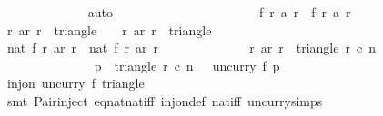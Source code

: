 \begin{isabellebody}
\ \ \ \ \ \ \ \ \ \ \ \ \isamarkupfalse%
\ auto\isanewline
\isanewline
\ \ \ \ \ \ \ \ \ \ \isamarkupfalse%
\isanewline
\isanewline
\ \ \ \ \ \ \ \ \ \ \isamarkupfalse%
\ {\isachardoublequoteopen}f\ r{}\ {\isacharparenleft}a\ r{}{\isacharparenright}\ {\isacharequal}\ f\ r{}\ {\isacharparenleft}a\ r{}{\isacharparenright}{\isachardoublequoteclose}\isanewline
\ \ \ \ \ \ \ \ \ \ \ \ \isamarkupfalse%
\ {\isacharbackquoteopen}{\isacharparenleft}r{}{\isacharcomma}\ ar\ r{}{\isacharparenright}\ {\isasymin}\ triangle\ {}\ {}\ {}{}{}{}{\isacharbackquoteclose}\ {\isacharbackquoteopen}{\isacharparenleft}r{}{\isacharcomma}\ ar\ r{}{\isacharparenright}\ {\isasymin}\ triangle\ {}\ {}\ {}{}{}{}{\isacharbackquoteclose}\isanewline
\ \ \ \ \ \ \ \ \ \ \ \ \isamarkupfalse%
\ {\isacharbackquoteopen}nat\ {\isacharparenleft}f\ r{}\ {\isacharparenleft}ar\ r{}{\isacharparenright}{\isacharparenright}\ {\isacharequal}\ nat\ {\isacharparenleft}f\ r{}\ {\isacharparenleft}ar\ r{}{\isacharparenright}{\isacharparenright}{\isacharbackquoteclose}\isanewline
\ \ \ \ \ \ \ \ \ \ \ \ \isamarkupfalse%
\ {\isacartoucheopen}{\isacharparenleft}r{}{\isacharcomma}\ ar\ r{}{\isacharparenright}\ {\isasymin}\ triangle\ r{}\ c{}\ n{\isacartoucheclose}\ \isanewline
\ \ \ \ \ \ \ \ \ \ \ \ \isamarkupfalse%
\ {\isacartoucheopen}{\isasymforall}\ p\ {\isasymin}\ triangle\ r{}\ c{}\ n{\isachardot}\ {}{}{}{}\ {\isacharless}\ uncurry\ f\ p{\isacartoucheclose}\isanewline
\ \ \ \ \ \ \ \ \ \ \ \ \isamarkupfalse%
\ {\isacartoucheopen}inj{\isacharunderscore}on\ {\isacharparenleft}uncurry\ f{\isacharparenright}\ {\isacharparenleft}triangle\ {}\ {}\ {}{}{}{}{\isacharparenright}{\isacartoucheclose}\ \isanewline
\ \ \ \ \ \ \ \ \ \ \ \ \isamarkupfalse%
\ {\isacharparenleft}smt\ Pair{\isacharunderscore}inject\ eq{\isacharunderscore}nat{\isacharunderscore}nat{\isacharunderscore}iff\ inj{\isacharunderscore}on{\isacharunderscore}def\ nat{\isacharunderscore}{}{\isacharunderscore}iff\ uncurry{\isachardot}simps{\isacharparenright}\isanewline

\end{isabellebody}
